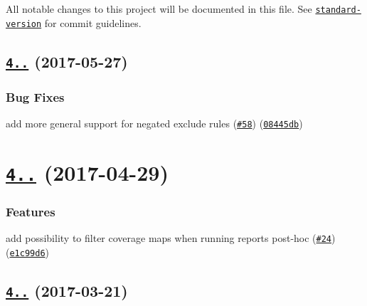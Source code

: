All notable changes to this project will be documented in this file. See \href{https://github.com/conventional-changelog/standard-version}{\tt standard-\/version} for commit guidelines.

\label{_4.1.1}%
 \subsection*{\href{https://github.com/istanbuljs/istanbuljs/compare/test-exclude@4.1.0...test-exclude@4.1.1}{\tt 4..} (2017-\/05-\/27)}

\subsubsection*{Bug Fixes}


\begin{DoxyItemize}
\item add more general support for negated exclude rules (\href{https://github.com/istanbuljs/istanbuljs/issues/58}{\tt \#58}) (\href{https://github.com/istanbuljs/istanbuljs/commit/08445db}{\tt 08445db})
\end{DoxyItemize}

\label{_4.1.0}%
 \section*{\href{https://github.com/istanbuljs/test-exclude/compare/test-exclude@4.0.3...test-exclude@4.1.0}{\tt 4..} (2017-\/04-\/29)}

\subsubsection*{Features}


\begin{DoxyItemize}
\item add possibility to filter coverage maps when running reports post-\/hoc (\href{https://github.com/istanbuljs/istanbuljs/issues/24}{\tt \#24}) (\href{https://github.com/istanbuljs/test-exclude/commit/e1c99d6}{\tt e1c99d6})
\end{DoxyItemize}

\label{_4.0.3}%
 \subsection*{\href{https://github.com/istanbuljs/test-exclude/compare/test-exclude@4.0.2...test-exclude@4.0.3}{\tt 4..} (2017-\/03-\/21)}

\label{_4.0.2}%
